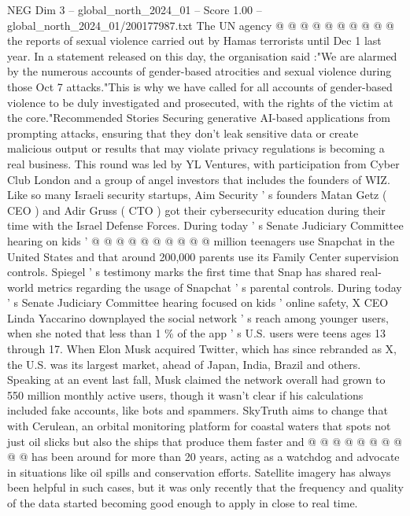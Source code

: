 \begin{textsample}{NEG Dim 3 – global\_north\_2024\_01 – Score 1.00 – global\_north\_2024\_01/200177987.txt}
The UN agency @ @ @ @ @ @ @ @ @ @ the reports of sexual violence carried out by Hamas terrorists until Dec 1 last year.
In a statement released on this day, the organisation said :"We are alarmed by the numerous accounts of gender-based atrocities and sexual violence during those Oct 7 attacks."This is why we have called for all accounts of gender-based violence to be duly investigated and prosecuted, with the rights of the victim at the core."Recommended Stories Securing generative AI-based applications from prompting attacks, ensuring that they don't leak sensitive data or create malicious output or results that may violate privacy regulations is becoming a real business.
This round was led by YL Ventures, with participation from Cyber Club London and a group of angel investors that includes the founders of WIZ.
Like so many Israeli security startups, Aim Security ' s founders Matan Getz ( CEO ) and Adir Gruss ( CTO ) got their cybersecurity education during their time with the Israel Defense Forces.
During today ' s Senate Judiciary Committee hearing on kids ' @ @ @ @ @ @ @ @ @ @ million teenagers use Snapchat in the United States and that around 200,000 parents use its Family Center supervision controls.
Spiegel ' s testimony marks the first time that Snap has shared real-world metrics regarding the usage of Snapchat ' s parental controls.
During today ' s Senate Judiciary Committee hearing focused on kids ' online safety, X CEO Linda Yaccarino downplayed the social network ' s reach among younger users, when she noted that less than 1 \% of the app ' s U.S. users were teens ages 13 through 17.
When Elon Musk acquired Twitter, which has since rebranded as X, the U.S. was its largest market, ahead of Japan, India, Brazil and others.
Speaking at an event last fall, Musk claimed the network overall had grown to 550 million monthly active users, though it wasn't clear if his calculations included fake accounts, like bots and spammers.
SkyTruth aims to change that with Cerulean, an orbital monitoring platform for coastal waters that spots not just oil slicks but also the ships that produce them faster and @ @ @ @ @ @ @ @ @ @ has been around for more than 20 years, acting as a watchdog and advocate in situations like oil spills and conservation efforts.
Satellite imagery has always been helpful in such cases, but it was only recently that the frequency and quality of the data started becoming good enough to apply in close to real time.

\end{textsample}
